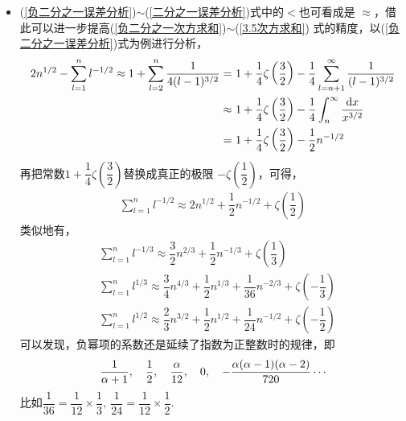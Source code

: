 \begin{itemize}[leftmargin=\inteval{\myitemleftmargin}pt,itemsep=
   \inteval{\myitemitempsep}pt,topsep=\inteval{\myitemtopsep}pt]
\begin{align}
    \dfrac{3}{4}n^{4/3}+\dfrac{1}{2}n^{1/3}
    \underbrace{-\dfrac{5}{18}}_{\approx -0.2778}
    <\dfrac{3}{4}n^{4/3}+\dfrac{1}{2}n^{1/3}+
    \underbrace{\zeta\left(-\dfrac{1}{3}\right)}_{\approx -0.2773}   
    < &\ \sum\limits_{l=1}^{n} l^{1/3}\leq \dfrac{3}{4}n^{4/3}
    +\dfrac{1}{2}n^{1/3}-\dfrac{1}{4}  \\
    \dfrac{2}{3}n^{3/2}+\dfrac{1}{2}n^{1/2}
    \underbrace{-\dfrac{5}{24}}_{\approx -0.2083}
    <\dfrac{2}{3}n^{3/2}+\dfrac{1}{2}n^{1/2}+
    \underbrace{\zeta\left(-\dfrac{1}{2}\right)}_{\approx -0.2079}  
    < &\ \sum\limits_{l=1}^{n} l^{1/2}\leq \dfrac{2}{3}n^{3/2}
    +\dfrac{1}{2}n^{1/2}-\dfrac{1}{6} 
\end{align}

\item (\ref{负二分之一误差分析})$ \sim $(\ref{二分之一误差分析})式中的$ < $也可看成是
$ \approx $，借此可以进一步提高(\ref{负二分之一次方求和})$ \sim $(\ref{3.5次方求和})
式的精度，以(\ref{负二分之一误差分析})式为例进行分析，
\begin{align*}
    2n^{1/2}-\sum_{l=1}^{n}l^{-1/2}\approx 1+\sum_{l=2}^{n}\dfrac{1}{4(l-1)^{3/2}} 
    =&\ 1+\dfrac{1}{4}\zeta\left(\dfrac{3}{2}\right)-\dfrac{1}{4}\sum_{l=n+1}^{\infty}
    \dfrac{1}{(l-1)^{3/2}} \\
    \approx&\ 1+\dfrac{1}{4}\zeta\left(\dfrac{3}{2}\right)-
    \dfrac{1}{4}\int_n^{\infty}\dfrac{\d x}{x^{3/2}} \\
    =&\ 1+\dfrac{1}{4}\zeta\left(\dfrac{3}{2}\right)-\dfrac{1}{2}n^{-1/2}
\end{align*}
再把常数$ 1+\dfrac{1}{4}\zeta\left(\dfrac{3}{2}\right) $替换成真正的极限
$ -\zeta\left(\dfrac{1}{2}\right) $，可得，
\begin{gather} \label{负二分之一次方求和-带负幂项}
    \sum_{l=1}^{n}l^{-1/2}\approx 2n^{1/2}+\dfrac{1}{2}n^{-1/2}+
    \zeta\left(\dfrac{1}{2}\right)
\end{gather}
类似地有，
\begin{align}
    &\sum\limits_{l=1}^{n} l^{-1/3}\approx \dfrac{3}{2}n^{2/3}+\dfrac{1}{2}n^{-1/3}
    +\zeta\left(\dfrac{1}{3}\right)  \label{负三分之一次方求和-带负幂项} \\     
    &\sum\limits_{l=1}^{n} l^{1/3}\approx \dfrac{3}{4}n^{4/3}
    +\dfrac{1}{2}n^{1/3}+\dfrac{1}{36}n^{-2/3}
    +\zeta\left(-\dfrac{1}{3}\right)  \label{三分之一次方求和-带负幂项} \\
    &\sum\limits_{l=1}^{n} l^{1/2}\approx \dfrac{2}{3}n^{3/2}
    +\dfrac{1}{2}n^{1/2}+\dfrac{1}{24}n^{-1/2}
    +\zeta\left(-\dfrac{1}{2}\right)  \label{0.5次方求和-带负幂项}
\end{align}
可以发现，负幂项的系数还是延续了指数为正整数时的规律，即
\begin{gather*}
    \dfrac{1}{\alpha+1},\quad   \dfrac{1}{2},\quad  \dfrac{\alpha}{12},\quad 
    0,\quad  -\dfrac{\alpha (\alpha-1)(\alpha-2)}{720}\cdots
\end{gather*}
比如$ \dfrac{1}{36}=\dfrac{1}{12}\times\dfrac{1}{3},\  \dfrac{1}{24}=
\dfrac{1}{12}\times\dfrac{1}{2} $. 


\end{itemize}
